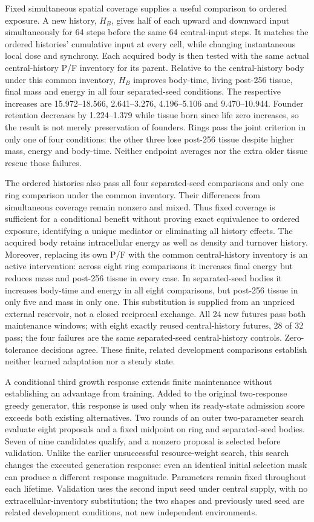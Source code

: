 Fixed simultaneous spatial coverage supplies a useful comparison to ordered exposure. A new history, $H_B$, gives half of each upward and downward input simultaneously for 64 steps before the same 64 central-input steps. It matches the ordered histories' cumulative input at every cell, while changing instantaneous local dose and synchrony. Each acquired body is then tested with the same actual central-history P/F inventory for its parent. Relative to the central-history body under this common inventory, $H_B$ improves body-time, living post-256 tissue, final mass and energy in all four separated-seed conditions. The respective increases are 15.972--18.566, 2.641--3.276, 4.196--5.106 and 9.470--10.944. Founder retention decreases by 1.224--1.379 while tissue born since life zero increases, so the result is not merely preservation of founders. Rings pass the joint criterion in only one of four conditions: the other three lose post-256 tissue despite higher mass, energy and body-time. Neither endpoint averages nor the extra older tissue rescue those failures.

The ordered histories also pass all four separated-seed comparisons and only one ring comparison under the common inventory. Their differences from simultaneous coverage remain nonzero and mixed. Thus fixed coverage is sufficient for a conditional benefit without proving exact equivalence to ordered exposure, identifying a unique mediator or eliminating all history effects. The acquired body retains intracellular energy as well as density and turnover history. Moreover, replacing its own P/F with the common central-history inventory is an active intervention: across eight ring comparisons it increases final energy but reduces mass and post-256 tissue in every case. In separated-seed bodies it increases body-time and energy in all eight comparisons, but post-256 tissue in only five and mass in only one. This substitution is supplied from an unpriced external reservoir, not a closed reciprocal exchange. All 24 new futures pass both maintenance windows; with eight exactly reused central-history futures, 28 of 32 pass; the four failures are the same separated-seed central-history controls. Zero-tolerance decisions agree. These finite, related development comparisons establish neither learned adaptation nor a steady state.

A conditional third growth response extends finite maintenance without establishing an advantage from training. Added to the original two-response greedy generator, this response is used only when its ready-state admission score exceeds both existing alternatives. Two rounds of an outer two-parameter search evaluate eight proposals and a fixed midpoint on ring and separated-seed bodies. Seven of nine candidates qualify, and a nonzero proposal is selected before validation. Unlike the earlier unsuccessful resource-weight search, this search changes the executed generation response: even an identical initial selection mask can produce a different response magnitude. Parameters remain fixed throughout each lifetime. Validation uses the second input seed under central supply, with no extracellular-inventory substitution; the two shapes and previously used seed are related development conditions, not new independent environments.

